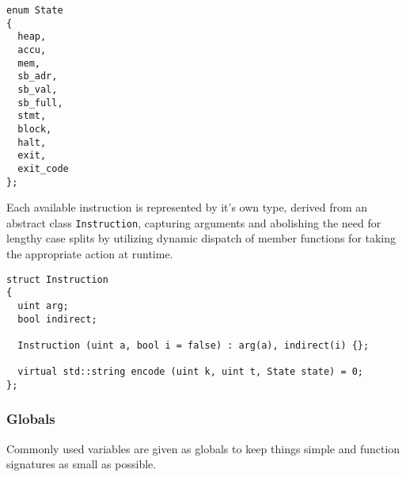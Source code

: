 \begin{lstlisting}[style=c++]
enum State
{
  heap,
  accu,
  mem,
  sb_adr,
  sb_val,
  sb_full,
  stmt,
  block,
  halt,
  exit,
  exit_code
};
\end{lstlisting}
Each available instruction is represented by it's own type, derived from an abstract class \texttt{Instruction}, capturing arguments and abolishing the need for lengthy case splits by utilizing dynamic dispatch of member functions for taking the appropriate action at runtime.%
\begin{lstlisting}[style=c++]
struct Instruction
{
  uint arg;
  bool indirect;

  Instruction (uint a, bool i = false) : arg(a), indirect(i) {};

  virtual std::string encode (uint k, uint t, State state) = 0;
};
\end{lstlisting}

\subsubsection{Globals}

Commonly used variables are given as globals to keep things simple and function signatures as small as possible.

